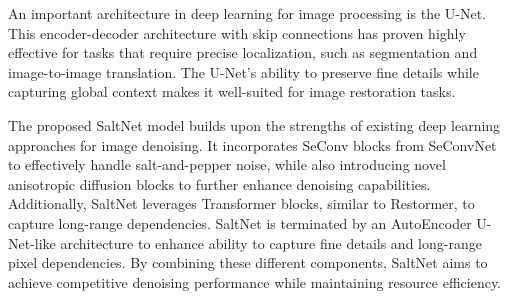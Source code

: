 An important architecture in deep learning for image processing is the U-Net. This encoder-decoder architecture with skip connections has proven highly effective for tasks that require precise localization, such as segmentation and image-to-image translation. The U-Net's ability to preserve fine details while capturing global context makes it well-suited for image restoration tasks.\cite{Wu2022}

The proposed SaltNet model builds upon the strengths of existing deep learning approaches for image denoising. It incorporates SeConv blocks from SeConvNet to effectively handle salt-and-pepper noise, while also introducing novel anisotropic diffusion blocks to further enhance denoising capabilities. Additionally, SaltNet leverages Transformer blocks, similar to Restormer, to capture long-range dependencies. SaltNet is terminated by an AutoEncoder U-Net-like architecture to enhance ability to capture fine details and long-range pixel dependencies. By combining these different components, SaltNet aims to achieve competitive denoising performance while maintaining resource efficiency.
